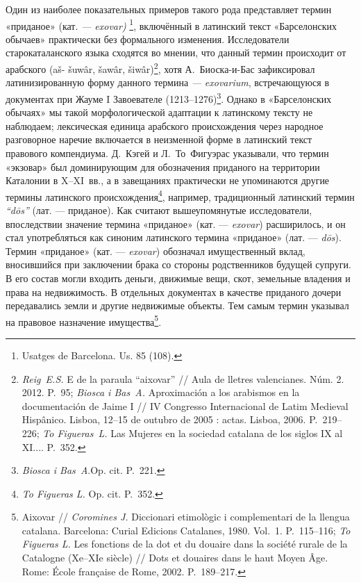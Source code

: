Один из наиболее показательных примеров такого рода представляет термин «приданое»\emph{ }(кат.\emph{ --- exovar)}\emph{\textsuperscript{ }}\footnote{Usatges de Barcelona. Us. 85 (108).}, включённый в латинский текст «Барселонских обычаев» практически без формального изменения.\emph{ }Исследователи старокаталанского языка сходятся во мнении, что данный термин происходит от арабского  (aš- šuwâr, šawâr, šiwâr)\footnote{\emph{Reig~E.S.} E de la paraula “aixovar” // Aula de lletres valencianes. Núm. 2. 2012. P.~95; \emph{Biosca i Bas~A.} Aproximación a los arabismos en la documentación de Jaime I // IV Congresso Internacional de Latim Medieval Hispânico. Lisboa, 12--15 de outubro de 2005 : actas. Lisboa, 2006. P.~219--226; \emph{To Figueras~L. }Las Mujeres en la sociedad catalana de los siglos IX al XI.... P.~352.}, хотя А.~Биоска-и-Бас зафиксировал латинизированную форму данного термина \emph{--- }\emph{exovariu}\emph{m}, встречающуюся в документах при Жауме I Завоевателе (1213--1276)\footnote{\emph{Biosca i Bas~A}.Op. cit. P.~221.}. Однако в «Барселонских обычаях» мы такой морфологической адаптации к латинскому тексту не наблюдаем; лексическая единица арабского происхождения через народное разговорное наречие включается в неизменной форме в латинский текст правового компендиума. Д.~Кэгей и Л.~То~Фигуэрас указывали, что термин «экзовар» был доминирующим для обозначения приданого\emph{ }на территории Каталонии в X--XI~вв., а в завещаниях практически не упоминаются другие термины\emph{ }латинского происхождения\footnote{\emph{To Figueras L. }Op. cit. P.~352.}, например, традиционный латинский термин\emph{ “}\emph{d}\emph{ō}\emph{s}\emph{”} (лат. --- приданое). Как считают вышеупомянутые исследователи, впоследствии значение термина «приданое» (кат. --- \emph{exovar}) расширилось, и он стал употребляться как синоним латинского термина «приданое» (лат. --- \emph{dōs}). Термин «приданое» (кат. --- \emph{exovar}) обозначал имущественный вклад, вносившийся при заключении брака со стороны родственников будущей супруги. В его состав могли входить деньги, движимые вещи, скот, земельные владения и права на недвижимость. В отдельных документах в качестве приданого дочери передавались земли и другие недвижимые объекты. Тем самым термин указывал на правовое назначение имущества\footnote{Aixovar // \emph{Coromines J. }Diccionari etimològic i complementari de la llengua catalana. Barcelona: Curial Edicions Catalanes, 1980. Vol.~1. P.~115--116; \emph{To Figueras L. }Les fonctions de la dot et du douaire dans la société rurale de la Catalogne (Xe--XIe siècle) // Dots et douaires dans le haut Moyen Âge. Rome: École française de Rome, 2002. P.~189--217.}.


